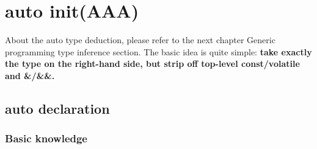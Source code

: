 \documentclass[a4paper,11pt,twoside]{book}
\begin{document}
\section{auto init(AAA)}

About the auto type deduction, please refer to the next chapter Generic programming type inference section. The basic idea is quite simple: \newline 
\textbf{take exactly the type on the right-hand side, but strip off top-level const/volatile and \&/\&\&.}

\subsection{auto declaration}
\subsubsection{Basic knowledge}
\end{document}
